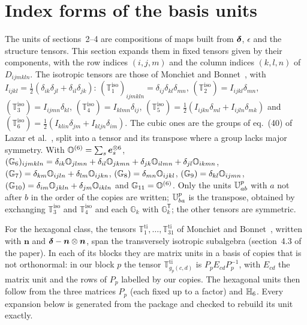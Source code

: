 \section{Index forms of the basis units}\label{sup:index}

The units of sections~2--4 are compositions of maps built from $\bm{\delta}$, $\epsilon$ and
the structure tensors. This section expands them in fixed tensors given by their
components, with the row indices $(i,j,m)$ and the column indices $(k,l,n)$ of
$D_{ijmkln}$. The isotropic tensors are those of Monchiet and
Bonnet~\cite[eq.~(2.3)]{Monchiet2011a}, with
$I_{ijkl}=\tfrac12(\delta_{ik}\delta_{jl}+\delta_{il}\delta_{jk})$:
$(\mathbb T^{\mathrm{iso}}_1)_{ijmkln}=\delta_{ij}\delta_{kl}\delta_{mn}$,
$(\mathbb T^{\mathrm{iso}}_2)=I_{ijkl}\delta_{mn}$,
$(\mathbb T^{\mathrm{iso}}_3)=I_{ijmn}\delta_{kl}$,
$(\mathbb T^{\mathrm{iso}}_4)=I_{klmn}\delta_{ij}$,
$(\mathbb T^{\mathrm{iso}}_5)=\tfrac12(I_{ijkn}\delta_{ml}+I_{ijln}\delta_{mk})$ and
$(\mathbb T^{\mathrm{iso}}_6)=\tfrac12(I_{klin}\delta_{jm}+I_{kljn}\delta_{im})$.
The cubic ones are the groups of eq.~(40) of Lazar et al.~\cite{Lazar2022}, split into a
tensor and its transpose where a group lacks major symmetry. With
$\mathbb{O}^{(6)}=\sum_s\bm e_s^{\otimes6}$,
$(\mathbb G_6)_{ijmkln}=\delta_{ik}\mathbb{O}_{jlmn}+\delta_{il}\mathbb{O}_{jkmn}+\delta_{jk}\mathbb{O}_{ilmn}
+\delta_{jl}\mathbb{O}_{ikmn}$,
$(\mathbb G_7)=\delta_{km}\mathbb{O}_{ijln}+\delta_{lm}\mathbb{O}_{ijkn}$,
$(\mathbb G_8)=\delta_{mn}\mathbb{O}_{ijkl}$,
$(\mathbb G_9)=\delta_{kl}\mathbb{O}_{ijmn}$,
$(\mathbb G_{10})=\delta_{im}\mathbb{O}_{jkln}+\delta_{jm}\mathbb{O}_{ikln}$ and
$\mathbb G_{11}=\mathbb{O}^{(6)}$.
Only the units $\mathbb{U}^{p}_{ab}$ with $a$ not after $b$ in the order of the copies are
written; $\mathbb{U}^{p}_{ba}$ is the transpose, obtained by exchanging $\mathbb
T^{\mathrm{iso}}_3$ and $\mathbb T^{\mathrm{iso}}_4$ and each $\mathbb G_k$ with
$\mathbb G_k^{\mathsf T}$; the other tensors are symmetric.

For the hexagonal class, the tensors $\mathbb T^{\mathrm{ti}}_1,\dots,\mathbb
T^{\mathrm{ti}}_{31}$ of Monchiet and Bonnet~\cite[eqs.~(32)--(33)]{Monchiet2013},
written with $\bm n$ and $\bm{\delta}-\bm n\otimes\bm n$, span the transversely isotropic
subalgebra (section~4.3 of the paper). In each of its blocks they are matrix units in a basis of
copies that is not orthonormal: in our block $p$ the tensor $\mathbb
T^{\mathrm{ti}}_{g_p(c,d)}$ is $P_pE_{cd}P_p^{-1}$, with $E_{cd}$ the matrix unit and the
rows of $P_p$ labelled by our copies. The hexagonal units then follow from the three
matrices $P_p$ (each fixed up to a factor) and $\mathbb{H}_{6}$. Every expansion below is
generated from the package and checked to rebuild its unit exactly.

%
